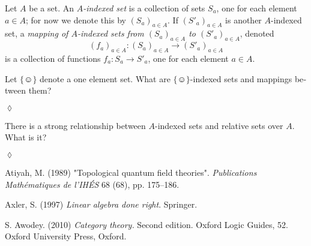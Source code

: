 \documentclass{book}
\def\singleton{\{\smiley\}}
\def\to{\rightarrow}
\def\taking{\colon}
\def\rr{\raggedright}
\theoremstyle{theoremENG}
\theoremstyle{lemmaENG}
\theoremstyle{propositionENG}
\theoremstyle{corollaryENG}
\theoremstyle{factENG}
\theoremstyle{remarkENG}
\theoremstyle{exampleENG}
\newtheorem{exampleENG}[subsubsection]{\begin{english}Example\end{english}}
\theoremstyle{warningENG}
\theoremstyle{questionENG}
\theoremstyle{guessENG}
\theoremstyle{answerENG}
\theoremstyle{constructionENG}
\theoremstyle{rulesENG}
\theoremstyle{excENG}
\newtheorem{excENG}[subsubsection]{\begin{english}Exercise\end{english}}
\theoremstyle{appENG}
\theoremstyle{definitionENG}
\newtheorem{definitionENG}[subsubsection]{\begin{english}Definition\end{english}}
\theoremstyle{notationENG}
\theoremstyle{conjectureENG}
\theoremstyle{postulateENG}
\newenvironment{exerciseENG}{\begin{excENG}}{\hspace*{\fill}$\lozenge$\end{excENG}}
\theoremstyle{theoremRUS}
\theoremstyle{lemmaRUS}
\theoremstyle{propositionRUS}
\theoremstyle{corollaryRUS}
\theoremstyle{factRUS}
\theoremstyle{remarkRUS}
\theoremstyle{exampleRUS}
\theoremstyle{warningRUS}
\theoremstyle{questionRUS}
\theoremstyle{guessRUS}
\theoremstyle{answerRUS}
\theoremstyle{constructionRUS}
\theoremstyle{rulesRUS}
\theoremstyle{excRUS}
\theoremstyle{appRUS}
\theoremstyle{definitionRUS}
\theoremstyle{notationRUS}
\theoremstyle{conjectureRUS}
\theoremstyle{postulateRUS}
\begin{document}
\begin{english}
\begin{exampleENG}
\end{exampleENG}

\begin{definitionENG}\label{def:indexed sets}

Let $A$ be a set. An {\em $A$-indexed set} is a collection of sets $S_a$, one for each element $a\in A$; for now we denote this by $(S_a)_{a\in A}$. If $(S'_a)_{a\in A}$ is another $A$-indexed set, a {\em mapping of $A$-indexed sets from $(S_a)_{a\in A}$ to $(S'_a)_{a\in A}$}, denoted $$(f_a)_{a\in A}\taking(S_a)_{a\in A}\to (S'_a)_{a\in A}$$ is a collection of functions $f_a\taking S_a\to S'_a$, one for each element $a\in A$.

\begin{russian} \end{russian}

\end{definitionENG}

\begin{exerciseENG}

Let $\singleton$ denote a one element set. What are $\singleton$-indexed sets and mappings between them?

\begin{russian} \end{russian}

\end{exerciseENG}

\begin{exerciseENG}

There is a strong relationship between $A$-indexed sets and relative sets over $A$. What is it? 

\begin{russian} \end{russian}

\end{exerciseENG}


\printindex



\begin{thebibliography}{SGWB}\rr

 Atiyah, M. (1989) "Topological quantum field theories". {\em Publications Math\'{e}matiques de l'IH\'{E}S} 68 (68), pp. 175--186.

 Axler, S. (1997) {\em Linear algebra done right}. Springer. 

 S. Awodey. (2010) {\em Category theory.} Second edition. Oxford Logic Guides, 52. Oxford University Press, Oxford.


\end{thebibliography}
\end{english}
\end{document}
